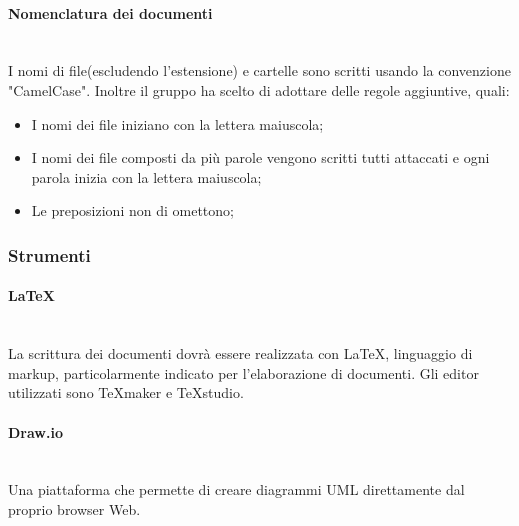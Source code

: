 \paragraph{Nomenclatura dei documenti}\mbox{} \\
I nomi di file(escludendo l'estensione) e cartelle sono scritti usando la convenzione "CamelCase". Inoltre il gruppo \Gruppo ha scelto di adottare delle regole aggiuntive, quali:
\begin{itemize}
\item I nomi dei file iniziano con la lettera maiuscola;
\item I nomi dei file composti da più parole vengono scritti tutti attaccati e ogni parola inizia con la lettera maiuscola;
\item Le preposizioni non di omettono;
\end{itemize}

\subsubsection{Strumenti}

\paragraph{\LaTeX}\mbox{} \\
La scrittura dei documenti dovrà essere realizzata con \LaTeX ,  linguaggio di markup,  particolarmente  indicato  per  l'elaborazione  di  documenti.
Gli editor utilizzati sono \TeX maker e \TeX studio.

\paragraph{Draw.io}\mbox{} \\
Una piattaforma che permette di creare diagrammi UML direttamente dal proprio browser Web.



